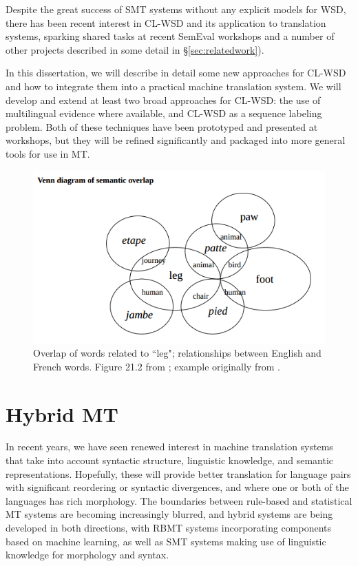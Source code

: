 Despite the great success of SMT systems without any explicit models for WSD,
there has been recent interest in CL-WSD and its application to translation
systems, sparking shared tasks at recent SemEval workshops
\cite{lefever-hoste:2010:SemEval,task10} and a number of other projects
described in some detail in \S\ref{sec:relatedwork}).


In this dissertation, we will describe in detail some new approaches for CL-WSD
and how to integrate them into a practical machine translation system.
We will develop and extend at least two broad approaches for CL-WSD: the use of
multilingual evidence where available, and CL-WSD as a sequence labeling
problem.
Both of these techniques have been prototyped and presented at workshops, but
they will be refined significantly and packaged into more general tools for use
in MT.  

\begin{figure}
  \includegraphics[width=12cm]{hutchins-leg-etc.png}
  \caption{Overlap of words related to ``leg"; relationships between English
  and French words. Figure 21.2 from \protect\cite{slp1}; example originally
  from \protect\cite[Chapter 6]{hutchins1992introduction}.}
  \label{fig:leg}
\end{figure}




\section{Hybrid MT}
In recent years, we have seen renewed interest in machine translation systems
that take into account syntactic structure, linguistic knowledge, and semantic
representations.
Hopefully, these will provide better translation for language pairs with
significant reordering or syntactic divergences, and where one or both of the
languages has rich morphology.
The boundaries between rule-based and statistical MT systems are becoming
increasingly blurred, and hybrid systems are being developed in both
directions, with RBMT systems incorporating components based on machine
learning, as well as SMT systems making use of linguistic knowledge for
morphology and syntax.

